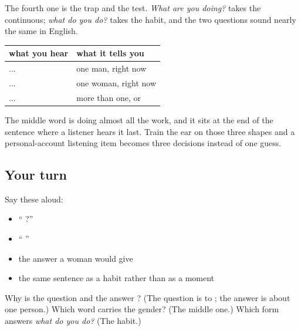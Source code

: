 The fourth one is the trap and the test. \emph{What are you doing?} takes the continuous; \emph{what do you do?} takes the habit, and the two questions sound nearly the same in English.

\begin{grammarlens}[title={Grammar Lens: what a listening paper does with this}]
\noindent
\begin{tabularx}{\linewidth}{@{}>{\raggedright\arraybackslash}X>{\raggedright\arraybackslash}X@{}}
\toprule
\textbf{what you hear} & \textbf{what it tells you} \\
\midrule
...\hi{रहा} \hi{है} & one man, right now \\
...\hi{रही} \hi{है} & one woman, right now \\
...\hi{रहे} \hi{हैं} & more than one, or \textbf{\hi{आप}} \\
\bottomrule
\end{tabularx}

The middle word is doing almost all the work, and it sits at the end of the sentence where a listener hears it last. Train the ear on those three shapes and a personal-account listening item becomes three decisions instead of one guess.
\end{grammarlens}

\subsection*{Your turn}
Say these aloud:

\begin{itemize}
\raggedright
  \item \textquotedblleft{}    ?\textquotedblright{}
  \item \textquotedblleft{}    \textquotedblright{}
  \item the answer a woman would give
  \item the same sentence as a habit rather than as a moment
\end{itemize}

\begin{tcolorbox}[breakable,colback=teal!4,colframe=teal!35!black,title={Before you move on}]
Why is the question \textbf{ } and the answer \textbf{ }? (The question is to \textbf{}; the answer is about one person.) Which word carries the gender? (The middle one.) Which form answers \emph{what do you do?} (The habit.)
\end{tcolorbox}
